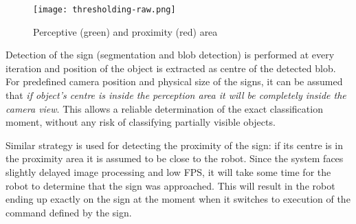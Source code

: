 \begin{figure}[th!]
	\centering
		\texttt{[image: thresholding-raw.png]}
	\caption{Perceptive (green) and proximity (red) area}
	\label{fig:camera-view-areas}
\end{figure}

Detection of the sign (segmentation and blob detection) is performed at every iteration and position of the object is extracted as centre of the detected blob. For predefined camera position and physical size of the signs, it can be assumed that \textit{if object's centre is inside the perception area it will be completely inside the camera view}. This allows a reliable determination of the exact classification moment, without any risk of classifying partially visible objects.

Similar strategy is used for detecting the proximity of the sign: if its centre is in the proximity area it is assumed to be close to the robot. Since the system faces slightly delayed image processing and low FPS, it will take some time for the robot to determine that the sign was approached. This will result in the robot ending up exactly on the sign at the moment when it switches to execution of the command defined by the sign.
